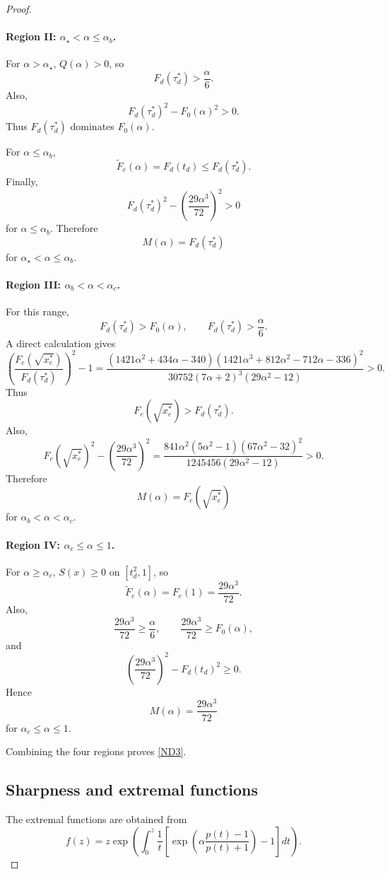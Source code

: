 \documentclass[10pt,a4paper]{amsart}
\numberwithin{equation}{section}
\begin{document}
\begin{proof}
\paragraph{Region II: $\alpha_\star<\alpha\le\alpha_b$.}
For $\alpha>\alpha_\star$, $Q(\alpha)>0$, so
\[
F_d(\tau_d^*)>\frac{\alpha}{6}.
\]
Also,
\[
F_d(\tau_d^*)^2-F_0(\alpha)^2>0.
\]
Thus $F_d(\tau_d^*)$ dominates $F_0(\alpha)$.

For $\alpha\le\alpha_b$,
\[
\widetilde F_e(\alpha)=F_d(t_d)\le F_d(\tau_d^*).
\]
Finally,
\[
F_d(\tau_d^*)^2
-
\left(\frac{29\alpha^3}{72}\right)^2
>0
\]
for $\alpha\le\alpha_b$. Therefore
\[
M(\alpha)=F_d(\tau_d^*)
\]
for $\alpha_\star<\alpha\le\alpha_b$.

\paragraph{Region III: $\alpha_b<\alpha<\alpha_c$.}
For this range,
\[
F_d(\tau_d^*)>F_0(\alpha),\qquad
F_d(\tau_d^*)>\frac{\alpha}{6}.
\]
A direct calculation gives
\[
\left(
\frac{F_e(\sqrt{x_e^*})}
{F_d(\tau_d^*)}
\right)^2-1
=
\frac{
(1421\alpha^2+434\alpha-340)
(1421\alpha^3+812\alpha^2-712\alpha-336)^2
}
{30752(7\alpha+2)^3(29\alpha^2-12)}
>0.
\]
Thus
\[
F_e(\sqrt{x_e^*})>F_d(\tau_d^*).
\]
Also,
\[
F_e(\sqrt{x_e^*})^2
-
\left(\frac{29\alpha^3}{72}\right)^2
=
\frac{
841\alpha^2(5\alpha^2-1)(67\alpha^2-32)^2
}
{1245456(29\alpha^2-12)}
>0.
\]
Therefore
\[
M(\alpha)=F_e(\sqrt{x_e^*})
\]
for $\alpha_b<\alpha<\alpha_c$.

\paragraph{Region IV: $\alpha_c\le\alpha\le1$.}
For $\alpha\ge\alpha_c$, $S(x)\ge0$ on $[t_d^2,1]$, so
\[
\widetilde F_e(\alpha)=F_e(1)=\frac{29\alpha^3}{72}.
\]
Also,
\[
\frac{29\alpha^3}{72}\ge \frac{\alpha}{6},\qquad
\frac{29\alpha^3}{72}\ge F_0(\alpha),
\]
and
\[
\left(\frac{29\alpha^3}{72}\right)^2
-
F_d(t_d)^2
\ge0.
\]
Hence
\[
M(\alpha)=\frac{29\alpha^3}{72}
\]
for $\alpha_c\le\alpha\le1$.

Combining the four regions proves \eqref{ND3}.

\subsection*{Sharpness and extremal functions}

The extremal functions are obtained from
\begin{equation}\label{pra27}
f(z)
=
z\exp\left(
\int_0^z \frac{1}{t}
\left[
\exp\left(
\alpha\frac{p(t)-1}{p(t)+1}
\right)
-1
\right]
dt
\right).
\end{equation}


\end{proof}
\end{document}
